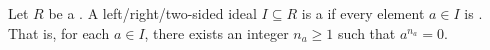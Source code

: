 \begin{definition} \label{definition:nil_ideal_of_a_ring}
Let $R$ be a .
A left/right/two-sided ideal $I \subseteq R$ is a  if every element $a \in I$ is . That is, for each $a \in I$, there exists an integer $n_a \geq 1$ such that $a^{n_a} = 0$.
\end{definition}